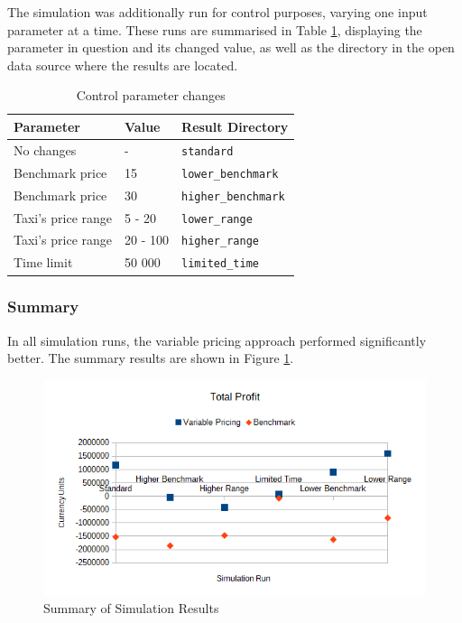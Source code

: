 The simulation was additionally run for control purposes, varying one input
parameter at a time. These runs are summarised in Table
\ref{table:inputs:control}, displaying the parameter in question and its
changed value, as well as the directory in the open data source where the
results are located.

\begin{table}
\begin{tabular}{ | l | l | l | }
  \hline
  Parameter & Value & Result Directory \\ \hline
  No changes & - & \texttt{standard} \\
  Benchmark price & 15 & \texttt{lower\_benchmark} \\
  Benchmark price & 30 & \texttt{higher\_benchmark} \\
  Taxi's price range & 5 - 20 & \texttt{lower\_range} \\
  Taxi's price range & 20 - 100 & \texttt{higher\_range} \\
  Time limit & 50 000 & \texttt{limited\_time} \\
  \hline
\end{tabular}
\caption{
  Control parameter changes
  \label{table:inputs:control}
}
\end{table}


\subsubsection{Summary}

In all simulation runs, the variable pricing approach performed significantly
better. The summary results are shown in Figure \ref{figure:results:summary}.

\begin{figure}
\begin{center}
  \includegraphics[width=\textwidth]{../figures/results_summary}
  \caption{
    Summary of Simulation Results
    \label{figure:results:summary}
  }
\end{center}
\end{figure}

